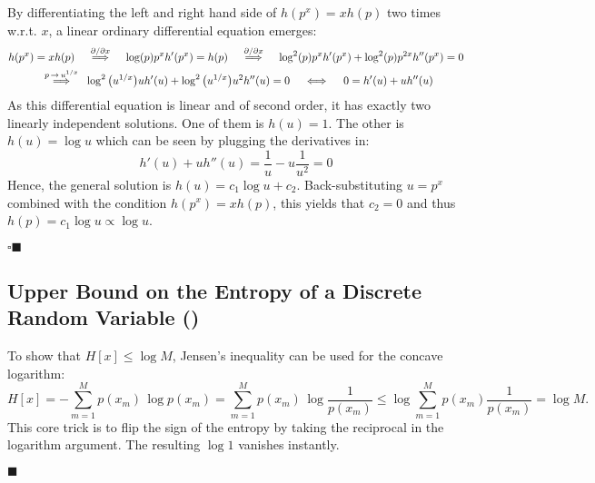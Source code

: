 \documentclass[11pt, a4paper]{scrartcl}
\newcommand{\eot}{\hfill\(\blacksquare\)}
\newcommand{\qedeot}{\hfill\(\square\blacksquare\)}
\newcommand{\diffstar}{\texorpdfstring{\raisebox{-1pt}{\resizebox{!}{8pt}{\(\star\)}}}{*}}
\newcommand{\onestar}  {(\diffstar)}
\begin{document}
			By differentiating the left and right hand side of \( h(p^x) = x h(p) \) two times w.r.t. \(x\), a linear ordinary differential equation emerges:
			\begin{gather}
				h(p^x) = x h(p)
				\overset{\pdv*{}{x}}{\quad\implies\quad}
				\log(p) p^x h'(p^x) = h(p)
				\overset{\pdv*{}{x}}{\quad\implies\quad}
				\log^2(p) p^x h'(p^x) + \log^2(p) p^{2x} h''(p^x) = 0 \\
				\overset{p \,\to\, u^{1/x}}{\quad\implies\quad}
				\log^2\big(u^{1/x}\big) u h'(u) + \log^2\big(u^{1/x}\big) u^2 h''(u) = 0
				\quad\iff\quad
				0 = h'(u) + u h''(u)
			\end{gather}
			As this differential equation is linear and of second order, it has exactly two linearly independent solutions. One of them is \(h(u) = 1\). The other is \( h(u) = \log u \) which can be seen by plugging the derivatives in:
			\begin{equation}
				h'(u) + u h''(u) = \frac{1}{u} - u \frac{1}{u^2} = 0
			\end{equation}
			Hence, the general solution is \( h(u) = c_1 \log u + c_2 \). Back-substituting \( u = p^x \) combined with the condition \( h(p^x) = x h(p) \), this yields that \( c_2 = 0 \) and thus \( h(p) = c_1 \log u \propto \log u \).

			\qedeot

		\subsection{Upper Bound on the Entropy of a Discrete Random Variable  \onestar}
			To show that \( H[x] \leq \log M \), Jensen's inequality can be used for the concave logarithm:
			\begin{equation}
				H[x]
					= -\sum_{m = 1}^{M} p(x_m) \, \log p(x_m)
					= \sum_{m = 1}^{M} p(x_m) \, \log \frac{1}{p(x_m)}
					\leq \log \sum_{m = 1}^{M} p(x_m) \frac{1}{p(x_m)}
					= \log M.
			\end{equation}
			This core trick is to flip the sign of the entropy by taking the reciprocal in the logarithm argument. The resulting \( \log 1 \) vanishes instantly.

			\eot
\end{document}

